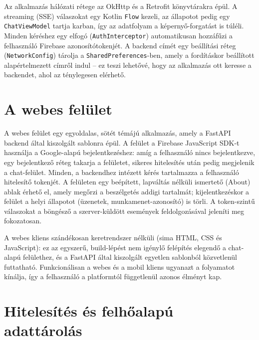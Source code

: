 Az alkalmazás hálózati rétege az OkHttp és a Retrofit könyvtárakra épül. A
streaming (SSE) válaszokat egy Kotlin \texttt{Flow} kezeli, az állapotot pedig
egy \texttt{ChatViewModel} tartja karban, így az adatfolyam a képernyő-forgatást
is túléli. Minden kéréshez egy elfogó (\texttt{AuthInterceptor}) automatikusan
hozzáfűzi a felhasználó Firebase azonosítótokenjét. A backend címét egy
beállítási réteg (\texttt{NetworkConfig}) tárolja a \texttt{SharedPreferences}-ben,
amely a fordításkor beállított alapértelmezett címről indul -- ez teszi lehetővé,
hogy az alkalmazás ott keresse a backendet, ahol az ténylegesen elérhető.

\section{A webes felület}

A webes felület egy egyoldalas, sötét témájú alkalmazás, amely a FastAPI backend
által kiszolgált sablonra épül. A felület a Firebase JavaScript SDK-t használja a
Google-alapú bejelentkezéshez: amíg a felhasználó nincs bejelentkezve, egy
bejelentkező réteg takarja a felületet, sikeres hitelesítés után pedig
megjelenik a chat-felület. Minden, a backendhez intézett kérés tartalmazza a
felhasználó hitelesítő tokenjét. A felületen egy beépített, lapváltás nélküli
ismertető (About) ablak érhető el, amely megőrzi a beszélgetés addigi tartalmát;
kijelentkezéskor a felület a helyi állapotot (üzenetek, munkamenet-azonosító) is
törli. A token-szintű válaszokat a böngésző a szerver-küldött események
feldolgozásával jeleníti meg fokozatosan.

A webes kliens szándékosan keretrendszer nélküli (sima HTML, CSS és JavaScript):
ez az egyszerű, build-lépést nem igénylő felépítés elegendő a chat-alapú
felülethez, és a FastAPI által kiszolgált egyetlen sablonból közvetlenül
futtatható. Funkcionálisan a webes és a mobil kliens ugyanazt a folyamatot
kínálja, így a felhasználó a platformtól függetlenül azonos élményt kap.

\section{Hitelesítés és felhőalapú adattárolás}


